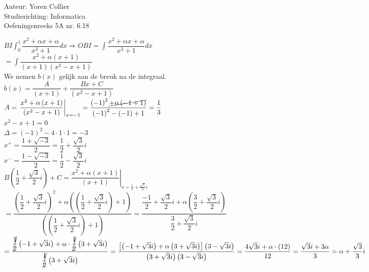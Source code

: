 \documentclass[a4paper]{article}
\newcommand{\adR}{\Rightarrow} %
\newcommand{\Lh}{\left(} %
\newcommand{\Rh}{\right)}
\newcommand{\Lv}{\left[} %
\newcommand{\Rv}{\right]}
\newcommand{\Rs}{\right|}
\newcommand{\Lsp}{\left.} %
\newcommand{\schrap}{\cancel}
\newcommand{\intgrl}{\displaystyle\int} %
\begin{document}
\noindent \large Auteur: Yoren Collier \\
\noindent \large Studierichting: Informatica\\
\noindent \large Oefeningenreeks 5A nr. 6.18\\

\medskip

\normalsize

$ BI \intgrl_0^1 \dfrac{x^2 + \alpha x + \alpha}{x^3 +1} dx \adR OBI = \intgrl \dfrac{x^2 + \alpha x + \alpha}{x^3 +1} dx$\\

$= \intgrl \dfrac{x^2 + \alpha \Lh x+1 \Rh}{\Lh x+1 \Rh \Lh x^2 -x +1 \Rh}$\\

We nemen $b(x)$ gelijk aan de breuk na de integraal.\\

$b(x) = \dfrac{A}{\Lh x+1 \Rh} + \dfrac{Bx + C}{\Lh x^2 -x +1 \Rh}$\\

$A = \Lsp \dfrac{x^2 + \alpha \Lh x+1 \Rh}{\Lh x^2 -x +1 \Rh} \Rs_{x= -1} = \dfrac{\Lh -1 \Rh^2 \schrap{+ \alpha \Lh -1 +1 \Rh}}{\Lh -1 \Rh^2 - \Lh -1 \Rh +1} = \dfrac{1}{3}$\\

$x^2 -x +1 = 0$\\

$\Delta = \Lh -1 \Rh^2 - 4 \cdot 1 \cdot 1 = -3$\\

$x^+ = \dfrac{1 + \sqrt{-3}}{2} = \dfrac{1}{2} + \dfrac{\sqrt{3}}{2}i$\\

$x^- = \dfrac{1 - \sqrt{-3}}{2} = \dfrac{1}{2} - \dfrac{\sqrt{3}}{2}i$\\

$B \Lh \dfrac{1}{2} + \dfrac{\sqrt{3}}{2}i \Rh + C = \Lsp \dfrac{x^2 + \alpha \Lh x+1 \Rh}{\Lh x +1 \Rh} \Rs_{x = \tfrac{1}{2} + \tfrac{\sqrt{3}}{2}i}$\\

$= \dfrac{\Lh \dfrac{1}{2} + \dfrac{\sqrt{3}}{2}i \Rh^2 + \alpha \Lh \Lh \dfrac{1}{2} + \dfrac{\sqrt{3}}{2}i \Rh +1 \Rh}{\Lh \Lh \dfrac{1}{2} + \dfrac{\sqrt{3}}{2}i \Rh +1 \Rh} = \dfrac{ \dfrac{-1}{2} + \dfrac{\sqrt{3}}{2}i + \alpha \Lh \dfrac{3}{2} + \dfrac{\sqrt{3}}{2}i \Rh}{\dfrac{3}{2} + \dfrac{\sqrt{3}}{2}i}$\\

$= \dfrac{\schrap{\dfrac{1}{2}} \Lh -1 + \sqrt{3}i \Rh + \alpha \cdot \schrap{\dfrac{1}{2}} \Lh 3 + \sqrt{3}i \Rh }{\schrap{\dfrac{1}{2}} \Lh 3 + \sqrt{3}i \Rh} = \dfrac{ \Lv \Lh -1 + \sqrt{3}i \Rh + \alpha \Lh 3 + \sqrt{3}i \Rh \Rv \Lh 3 - \sqrt{3}i \Rh}{\Lh 3 + \sqrt{3}i \Rh \Lh 3 - \sqrt{3}i \Rh} = \dfrac{4\sqrt{3}i + \alpha \cdot \Lh 12 \Rh}{12} = \dfrac{\sqrt{3}i + 3\alpha}{3} = \alpha + \dfrac{\sqrt{3}}{3}i$\\
\end{document}
